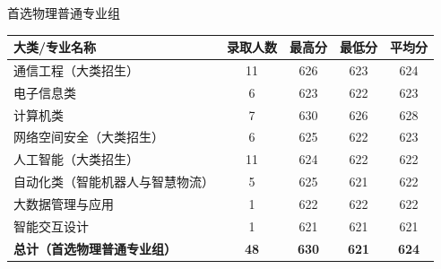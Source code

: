 \documentclass[aspectratio=169, utf8]{beamer}
\begin{document}
\begin{frame}{首选物理普通专业组}
    \begin{table}
        \small
        \centering
        \begin{tabular}{lcccc}
            \toprule
            \textcolor{Fore}{\textbf{大类/专业名称}}       & \textcolor{Fore}{\textbf{录取人数}} & \textcolor{Fore}{\textbf{最高分}} & \textcolor{Fore}{\textbf{最低分}} & \textcolor{Fore}{\textbf{平均分}} \\ \midrule
            通信工程（大类招生）                               & 11                              & 626                            & 623                            & 624                            \\
            电子信息类                                    & 6                               & 623                            & 622                            & 623                            \\
            计算机类                                     & 7                               & 630                            & 626                            & 628                            \\
            网络空间安全（大类招生）                             & 6                               & 625                            & 622                            & 623                            \\
            人工智能（大类招生）                               & 11                              & 624                            & 622                            & 622                            \\
            自动化类（智能机器人与智慧物流）                         & 5                               & 625                            & 621                            & 622                            \\
            大数据管理与应用                                 & 1                               & 622                            & 622                            & 622                            \\
            智能交互设计                                   & 1                               & 621                            & 621                            & 621                            \\
            \textcolor{Fore}{\textbf{总计（首选物理普通专业组）}} & \textcolor{Fore}{\textbf{48}}   & \textcolor{Fore}{\textbf{630}} & \textcolor{Fore}{\textbf{621}} & \textcolor{Fore}{\textbf{624}} \\ \midrule
        \end{tabular}
    \end{table}
\end{frame}
\end{document}
